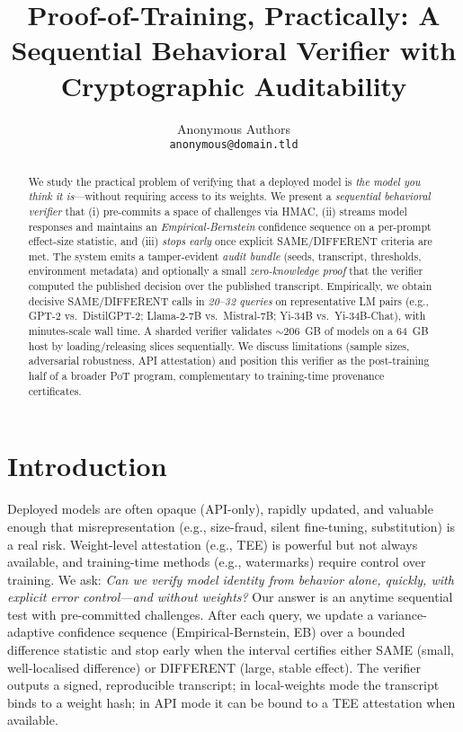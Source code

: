 \documentclass{article}
\title{Proof-of-Training, Practically: A Sequential Behavioral Verifier with Cryptographic Auditability}
\author{%
  Anonymous Authors\\
  \texttt{anonymous@domain.tld}
}
\begin{document}
\maketitle

\begin{abstract}
We study the practical problem of verifying that a deployed model is \emph{the model you think it is}---without requiring access to its weights.
We present a \emph{sequential behavioral verifier} that (i) pre-commits a space of challenges via HMAC, (ii) streams model responses and maintains an \emph{Empirical-Bernstein} confidence sequence on a per-prompt effect-size statistic, and (iii) \emph{stops early} once explicit SAME/DIFFERENT criteria are met. The system emits a tamper-evident \emph{audit bundle} (seeds, transcript, thresholds, environment metadata) and optionally a small \emph{zero-knowledge proof} that the verifier computed the published decision over the published transcript. Empirically, we obtain decisive SAME/DIFFERENT calls in \emph{20--32 queries} on representative LM pairs (e.g., GPT-2 vs.\ DistilGPT-2; Llama-2-7B vs.\ Mistral-7B; Yi-34B vs.\ Yi-34B-Chat), with minutes-scale wall time. A sharded verifier validates $\sim$206~GB of models on a 64~GB host by loading/releasing slices sequentially. We discuss limitations (sample sizes, adversarial robustness, API attestation) and position this verifier as the post-training half of a broader PoT program, complementary to training-time provenance certificates.
\end{abstract}

\section{Introduction}
Deployed models are often opaque (API-only), rapidly updated, and valuable enough that misrepresentation (e.g., size-fraud, silent fine-tuning, substitution) is a real risk.
Weight-level attestation (e.g., TEE) is powerful but not always available, and training-time methods (e.g., watermarks) require control over training.
We ask: \emph{Can we verify model identity from behavior alone, quickly, with explicit error control---and without weights?}
Our answer is an anytime sequential test with pre-committed challenges. After each query, we update a variance-adaptive confidence sequence (Empirical-Bernstein, EB) over a bounded difference statistic and stop early when the interval certifies either SAME (small, well-localised difference) or DIFFERENT (large, stable effect). The verifier outputs a signed, reproducible transcript; in local-weights mode the transcript binds to a weight hash; in API mode it can be bound to a TEE attestation when available.
\end{document}
